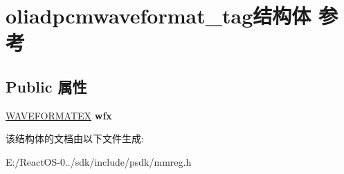 \hypertarget{structoliadpcmwaveformat__tag}{}\section{oliadpcmwaveformat\+\_\+tag结构体 参考}
\label{structoliadpcmwaveformat__tag}
\subsection*{Public 属性}
\begin{DoxyCompactItemize}
\item 
\mbox{\label{structoliadpcmwaveformat__tag_a64272106097091d6f1df7f65d5cc0021}} 
\hyperlink{struct_w_a_v_e_f_o_r_m_a_t_e_x}{W\+A\+V\+E\+F\+O\+R\+M\+A\+T\+EX} {\bfseries wfx}
\end{DoxyCompactItemize}


该结构体的文档由以下文件生成\+:\begin{DoxyCompactItemize}
\item 
E\+:/\+React\+O\+S-\/0../sdk/include/psdk/mmreg.\+h\end{DoxyCompactItemize}
